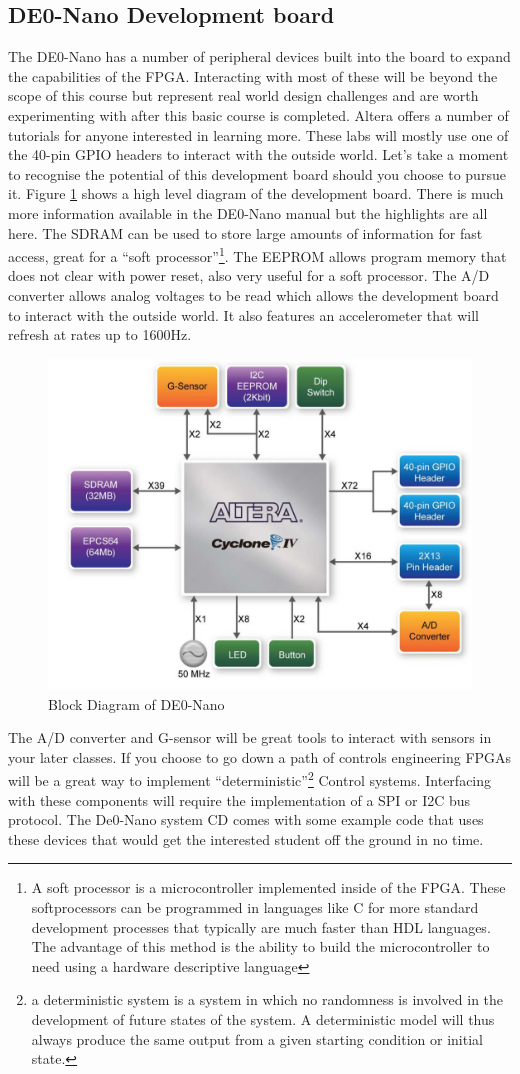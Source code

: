    \subsection{DE0-Nano Development board}
      The DE0-Nano has a number of peripheral devices built into the board to expand the capabilities of the FPGA. Interacting with most of these will be beyond the scope of this course but represent real world design challenges and are worth experimenting with after this basic course is completed. Altera offers a number of tutorials for anyone interested in learning more. These labs will mostly use one of the 40-pin GPIO headers to interact with the outside world. Let's take a moment to recognise the potential of this development board should you choose to pursue it. Figure \ref{DEOBlockDia} shows a high level diagram of the development board. There is much more information available in the DE0-Nano manual but the highlights are all here. The SDRAM can be used to store large amounts of information for fast access, great for a ``soft processor''\footnote{A soft processor is a microcontroller implemented inside of the FPGA. These softprocessors can be programmed in languages like C for more standard development processes that typically are much faster than HDL languages. The advantage of this method is the ability to build the microcontroller to need using a hardware descriptive language}. The EEPROM allows program memory that does not clear with power reset, also very useful for a soft processor. The A/D converter allows analog voltages to be read which allows the development board to interact with the outside world. It also features an accelerometer that will refresh at rates up to 1600Hz.      \begin{figure}[htpb]
        \includegraphics[width=.48\textwidth]{Images/DEONanoBlockDiagram.png}
        \caption{Block Diagram of DE0-Nano \cite{DE0Manual}}
        \label{DEOBlockDia}
      \end{figure}
      The A/D converter and G-sensor will be great tools to interact with sensors in your later classes. If you choose to go down a path of controls engineering FPGAs will be a great way to implement ``deterministic''\footnote{a deterministic system is a system in which no randomness is involved in the development of future states of the system. A deterministic model will thus always produce the same output from a given starting condition or initial state.\cite{DynamicSystems}} Control systems. Interfacing with these components will require the implementation of a SPI or I2C bus protocol. The De0-Nano system CD comes with some example code that uses these devices that would get the interested student off the ground in no time.

